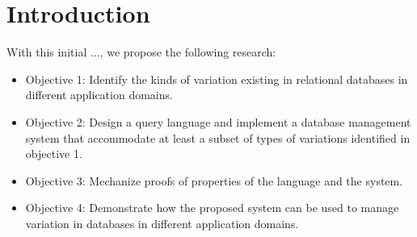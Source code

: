 \section{Introduction}
\label{sec:intro}


With this initial ..., we propose the following research:

\begin{itemize}
\item Objective 1: Identify the kinds of variation existing in relational databases in 
different application domains.
\item Objective 2: Design a query language and implement a database management 
system that accommodate at least a subset of types of variations identified in objective 1.
\item Objective 3: Mechanize proofs of properties of the language and the system.
\item Objective 4: Demonstrate how the proposed system can be used to manage
variation in databases in different application domains.
\end{itemize}

